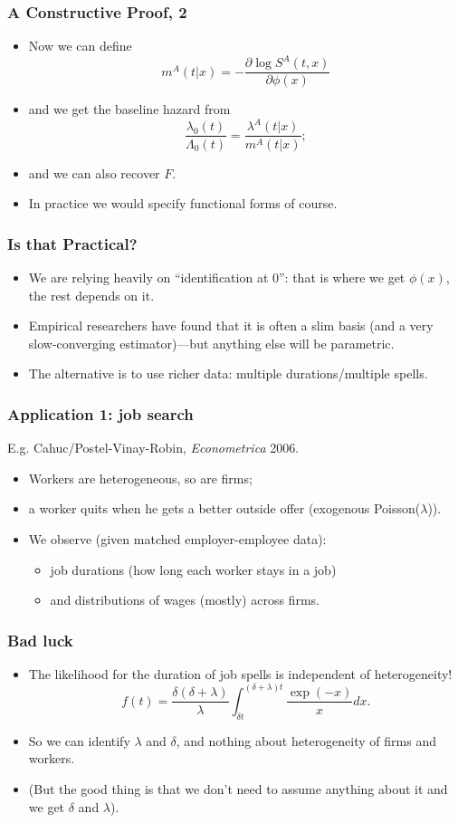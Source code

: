 \documentclass[xcolor=pdftex,dvipsnames,table,mathserif]{beamer}
\begin{document}
\begin{frame}
\frametitle{A Constructive Proof, 2}
\begin{itemize}
\item Now we can define
\[
m^A(t \vert x)=-\frac{\partial \log S^A(t,x)}{\partial \phi(x)}
\]
\item and we get the baseline hazard from 
\[
\frac{\lambda_0(t)}{\Lambda_0(t)}=\frac{\lambda^A(t \vert x)}{m^A(t \vert x)};
\]
\item  and we can also recover $F$. 
\item In practice we would specify functional forms of course.
\end{itemize}
\end{frame}


\begin{frame}
\frametitle{Is that Practical?}
\begin{itemize}
\item We are relying heavily on ``identification at 0'': that is where we
get $\phi(x)$, the rest depends on it.
\item Empirical researchers have found that it is often a slim basis (and a
very slow-converging estimator)---but
anything else will be parametric.
\item The alternative is to use richer data: multiple durations/multiple spells. 
\end{itemize}
\end{frame}

\begin{frame}
\frametitle{Application 1: job search}
E.g. Cahuc/Postel-Vinay-Robin, {\em Econometrica \/} 2006.
\begin{itemize}
\item Workers are heterogeneous, so are firms; 
\item a worker quits when he gets a better outside offer (exogenous Poisson($\lambda$)).
\item We observe (given matched employer-employee data): 
\begin{itemize}
\item job durations (how long each worker stays in a job)
\item and distributions of wages (mostly) across firms.
\end{itemize}
\end{itemize}
\end{frame}


\begin{frame}
\frametitle{Bad luck}
\begin{itemize}
\item The likelihood for the duration of job spells is independent of heterogeneity!
\[
f(t)=\frac{\delta(\delta+\lambda)}{\lambda}\int_{\delta t}^{(\delta+\lambda)t} \frac{\exp(-x)}{x} dx.
\]
\item So we can identify $\lambda$ and $\delta$, and nothing about heterogeneity of firms and workers.
\item (But the good thing is that we don't need to assume anything about it and we get $\delta$ and $\lambda$).
\end{itemize}
\end{frame}
\end{document}
